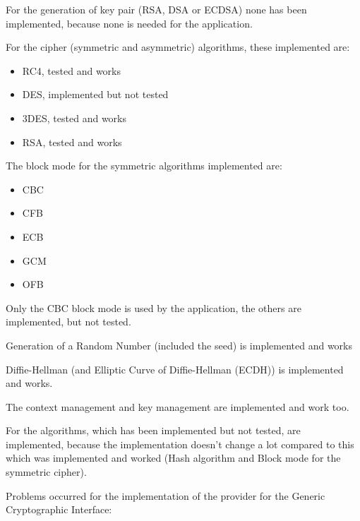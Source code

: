 For the generation of key pair (RSA, DSA or ECDSA) none has been implemented,
because none is needed for the \embtls application.

For the cipher (symmetric and asymmetric) algorithms, these implemented are:
\begin{itemize}[noitemsep]
  \item RC4, tested and works
  \item DES, implemented but not tested
  \item 3DES, tested and works
  \item RSA, tested and works
\end{itemize}

The block mode for the symmetric algorithms implemented are:
\begin{itemize}[noitemsep]
  \item CBC
  \item CFB
  \item ECB
  \item GCM
  \item OFB
\end{itemize}
Only the CBC block mode is used by the \embtls application, the others are
implemented, but not tested.

Generation of a Random Number (included the seed) is implemented and works

Diffie-Hellman (and Elliptic Curve of Diffie-Hellman (ECDH)) is implemented and
works.

The context management and key management are implemented and work too.

For the algorithms, which has been implemented but not tested, are implemented,
because the implementation doesn't change a lot compared to this which was
implemented and worked (Hash algorithm and Block mode for the symmetric cipher).

Problems occurred for the implementation of the \tomcrypt provider for the
Generic Cryptographic Interface:

